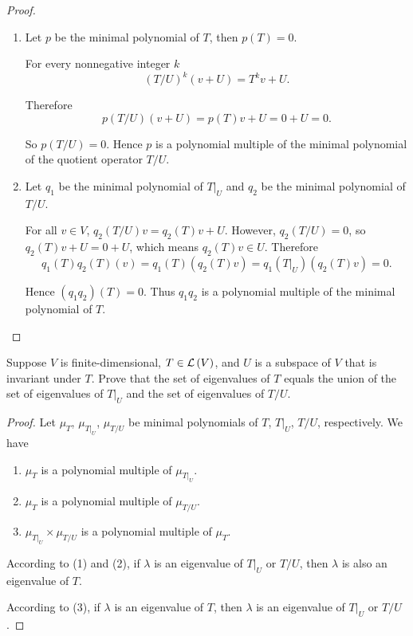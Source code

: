\begin{proof}
    \begin{enumerate}[label={(\alph*)}]
        \item Let $p$ be the minimal polynomial of $T$, then $p(T) = 0$.

              For every nonnegative integer $k$
              \[
                  {(T/U)}^{k}(v + U) = T^{k}v + U.
              \]

              Therefore
              \[
                  p(T/U)(v + U) = p(T)v + U = 0 + U = 0.
              \]

              So $p(T/U) = 0$. Hence $p$ is a polynomial multiple of the minimal polynomial of the quotient operator $T/U$.
        \item Let $q_{1}$ be the minimal polynomial of $T\vert_{U}$ and $q_{2}$ be the minimal polynomial of $T/U$.

              For all $v\in V$, $q_{2}(T/U)v = q_{2}(T)v + U$. However, $q_{2}(T/U) = 0$, so $q_{2}(T)v + U = 0 + U$, which means $q_{2}(T)v\in U$. Therefore
              \[
                  q_{1}(T)q_{2}(T)(v) = q_{1}(T)(q_{2}(T)v) = q_{1}(T\vert_{U})(q_{2}(T)v) = 0.
              \]

              Hence $(q_{1}q_{2})(T) = 0$. Thus $q_{1}q_{2}$ is a polynomial multiple of the minimal polynomial of $T$.
    \end{enumerate}
\end{proof}
\newpage

\begin{exercise}
    Suppose $V$ is finite-dimensional, $T\in\mathcal{L}\left({V}\right)$, and $U$ is a subspace of $V$ that is invariant under $T$. Prove that the set of eigenvalues of $T$ equals the union of the set of eigenvalues of $T\vert_{U}$ and the set of eigenvalues of $T/U$.
\end{exercise}

\begin{proof}
    Let $\mu_{T}$, $\mu_{T\vert_{U}}$, $\mu_{T/U}$ be minimal polynomials of $T$, $T\vert_{U}$, $T/U$, respectively. We have
    \begin{enumerate}[label={(\arabic*)}]
        \item $\mu_{T}$ is a polynomial multiple of $\mu_{T\vert_U}$.
        \item $\mu_{T}$ is a polynomial multiple of $\mu_{T/U}$.
        \item $\mu_{T\vert_{U}}\times \mu_{T/U}$ is a polynomial multiple of $\mu_{T}$.
    \end{enumerate}

    According to (1) and (2), if $\lambda$ is an eigenvalue of $T\vert_{U}$ or $T/U$, then $\lambda$ is also an eigenvalue of $T$.

    According to (3), if $\lambda$ is an eigenvalue of $T$, then $\lambda$ is an eigenvalue of $T\vert_{U}$ or $T/U$.
\end{proof}
\newpage

